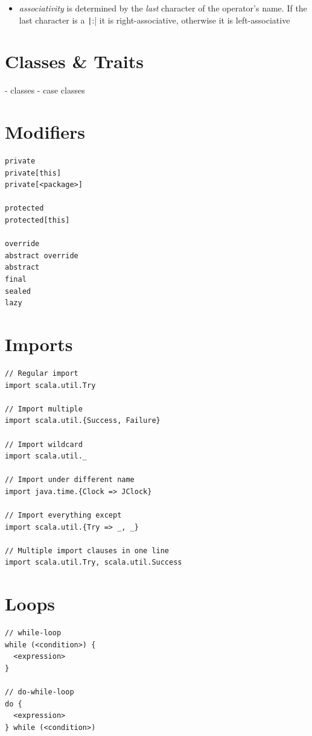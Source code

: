\documentclass[10pt,landscape,a4paper]{article}
\newcommand{\TODO}[2][]{\todo[inline,color=green!40,linecolor=green!50,#1]{\small TODO #2}}
\begin{document}
\begin{multicols*}{4}
\begin{itemize}
\begin{tabular}{l | l}
    \end{tabular}
  \item \textit{associativity} is determined by the \textit{last}
    character of the operator's name.  If the last character is a
    \texttt|:| it is right-associative, otherwise it is
    left-associative
  \end{itemize}

  \section{Classes \& Traits}
  \TODO{}

  - classes
  - case classes
  \section{Modifiers}
  \TODO{}

\begin{verbatim}
private
private[this]
private[<package>]

protected
protected[this]

override
abstract override
abstract
final
sealed
lazy
\end{verbatim}

    \section{Imports}

\begin{verbatim}
// Regular import
import scala.util.Try

// Import multiple
import scala.util.{Success, Failure}

// Import wildcard
import scala.util._

// Import under different name
import java.time.{Clock => JClock}

// Import everything except
import scala.util.{Try => _, _}

// Multiple import clauses in one line
import scala.util.Try, scala.util.Success
\end{verbatim}

  \section{Loops}

\begin{verbatim}
// while-loop
while (<condition>) {
  <expression>
}

// do-while-loop
do {
  <expression>
} while (<condition>)


\end{verbatim}
\end{multicols*}
\end{document}
